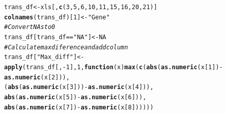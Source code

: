 \documentclass[12pt, a4paper]{article}\usepackage[]{graphicx}\usepackage[]{color}
\makeatletter
\newcommand{\hlnum}[1]{\textcolor[rgb]{0.686,0.059,0.569}{#1}}%
\newcommand{\hlstr}[1]{\textcolor[rgb]{0.192,0.494,0.8}{#1}}%
\newcommand{\hlcom}[1]{\textcolor[rgb]{0.678,0.584,0.686}{\textit{#1}}}%
\newcommand{\hlopt}[1]{\textcolor[rgb]{0,0,0}{#1}}%
\newcommand{\hlstd}[1]{\textcolor[rgb]{0.345,0.345,0.345}{#1}}%
\newcommand{\hlkwa}[1]{\textcolor[rgb]{0.161,0.373,0.58}{\textbf{#1}}}%
\newcommand{\hlkwb}[1]{\textcolor[rgb]{0.69,0.353,0.396}{#1}}%
\newcommand{\hlkwc}[1]{\textcolor[rgb]{0.333,0.667,0.333}{#1}}%
\newcommand{\hlkwd}[1]{\textcolor[rgb]{0.737,0.353,0.396}{\textbf{#1}}}%
\newenvironment{kframe}{%
 \def\at@end@of@kframe{}%
 \ifinner\ifhmode%
  \def\at@end@of@kframe{\end{minipage}}%
  \begin{minipage}{\columnwidth}%
 \fi\fi%
 \def\FrameCommand##1{\hskip\@totalleftmargin \hskip-\fboxsep
 \colorbox{shadecolor}{##1}\hskip-\fboxsep
     \hskip-\linewidth \hskip-\@totalleftmargin \hskip\columnwidth}%
 \MakeFramed {\advance\hsize-\width
   \@totalleftmargin\z@ \linewidth\hsize
   \@setminipage}}%
 {\par\unskip\endMakeFramed%
 \at@end@of@kframe}
\newenvironment{knitrout}{}{} %
\makeatother
\begin{document}
\begin{knitrout}
\begin{kframe}
\begin{alltt}
\hlstd{trans_df} \hlkwb{<-} \hlstd{xls[,}\hlkwd{c}\hlstd{(}\hlnum{3}\hlstd{,}\hlnum{5}\hlstd{,}\hlnum{6}\hlstd{,}\hlnum{10}\hlstd{,}\hlnum{11}\hlstd{,}\hlnum{15}\hlstd{,}\hlnum{16}\hlstd{,}\hlnum{20}\hlstd{,}\hlnum{21}\hlstd{)]}
\hlkwd{colnames}\hlstd{(trans_df)[}\hlnum{1}\hlstd{]} \hlkwb{<-} \hlstr{"Gene"}
\hlcom{#Convert NAs to 0}
\hlstd{trans_df[trans_df} \hlopt{==} \hlstr{"NA"}\hlstd{]} \hlkwb{<-} \hlnum{NA}
\hlcom{#Calculate max diference and add column}
\hlstd{trans_df[}\hlstr{"Max_diff"}\hlstd{]} \hlkwb{<-} \hlkwd{apply}\hlstd{(trans_df[,}\hlopt{-}\hlnum{1}\hlstd{],} \hlnum{1}\hlstd{,} \hlkwa{function}\hlstd{(}\hlkwc{x}\hlstd{)} \hlkwd{max}\hlstd{(}\hlkwd{c}\hlstd{(}\hlkwd{abs}\hlstd{(}\hlkwd{as.numeric}\hlstd{(x[}\hlnum{1}\hlstd{])} \hlopt{-} \hlkwd{as.numeric}\hlstd{(x[}\hlnum{2}\hlstd{])),}
                                                                  \hlstd{(}\hlkwd{abs}\hlstd{(}\hlkwd{as.numeric}\hlstd{(x[}\hlnum{3}\hlstd{]))} \hlopt{-} \hlkwd{as.numeric}\hlstd{(x[}\hlnum{4}\hlstd{])),}
                                                                  \hlkwd{abs}\hlstd{(}\hlkwd{as.numeric}\hlstd{(x[}\hlnum{5}\hlstd{])} \hlopt{-} \hlkwd{as.numeric}\hlstd{(x[}\hlnum{6}\hlstd{])),}
                                                                  \hlkwd{abs}\hlstd{(}\hlkwd{as.numeric}\hlstd{(x[}\hlnum{7}\hlstd{])} \hlopt{-} \hlkwd{as.numeric}\hlstd{(x[}\hlnum{8}\hlstd{])))))}


\end{alltt}
\end{kframe}
\end{knitrout}
\end{document}

